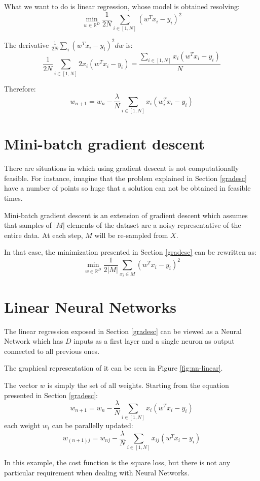 What we want to do is linear regression, whose model is obtained resolving:
\[\displaystyle \min_{w \in \mathbb{R}^D} \frac{1}{2N} \sum_{i \in [1, N]} (w^T x_i - y_i)^2\]

The derivative  $\frac{1}{2N} \sum_i (w^T x_i - y_i)^2 dw$ is:
\[\frac{1}{2N} \sum_{i \in [1, N]} 2 x_i(w^T x_i - y_i) = \frac{\sum_{i \in [1, N]} x_i(w^T x_i - y_i)}{N}\]

Therefore:
\[ w_{n+1} = w_n - \frac{\lambda}{N} \sum_{i \in [1, N]} x_i(w_i^T x_i - y_i) \]


\section{Mini-batch gradient descent}
There are situations in which using gradient descent is not computationally feasible.
For instance, imagine that the problem explained in Section \ref{gradesc} have
a number of points so huge that a solution can not be obtained in feasible times.

Mini-batch gradient descent is an extension of gradient descent which assumes that
samples of $|M|$ elements of the dataset are a noisy representative of the entire data.
At each step, $M$ will be re-sampled from $X$.

In that case, the minimization presented in Section \ref{gradesc} can be rewritten as:
\[\displaystyle \min_{w \in \mathbb{R}^D} \frac{1}{2|M|} \sum_{x_i \in M} (w^T x_i - y_i)^2 \]

\section{Linear Neural Networks}
The linear regression exposed in Section \ref{gradesc} can be viewed as a Neural Network
which has $D$ inputs as a first layer and a single neuron as output connected to all previous ones.

The graphical representation of it can be seen in Figure \ref{fig:nn-linear}.

The vector $w$ is simply the set of all weights.
Starting from the equation presented in Section \ref{gradesc}:
\[ w_{n+1} = w_n - \frac{\lambda}{N} \sum_{i \in [1, N]} x_i(w^T x_i - y_i) \]
each weight $w_i$ can be parallelly updated:
\[ w_{(n+1)j} = w_{nj} -  \frac{\lambda}{N} \sum_{i \in [1, N]} x_{ij}(w^T x_i - y_i) \]

In this example, the cost function is the square loss, but there is not any particular requirement when
dealing with Neural Networks.

